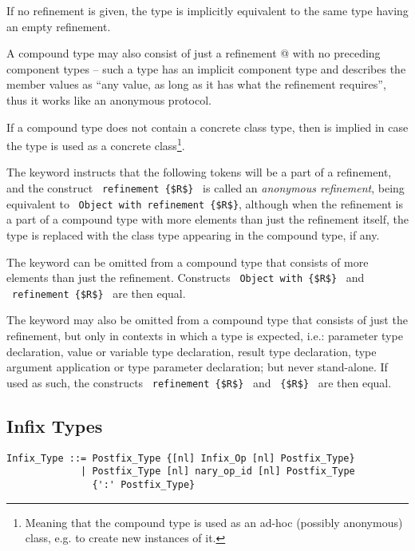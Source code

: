 If no refinement is given, the type is implicitly equivalent to the same type having an empty refinement. 

A compound type may also consist of just a refinement @ with no preceding component types -- such a type has an implicit component type  and describes the member values as ``any value, as long as it has what the refinement requires'', thus it works like an anonymous protocol. 

If a compound type does not contain a concrete class type, then  is implied in case the type is used as a concrete class\footnote{Meaning that the compound type is used as an ad-hoc (possibly anonymous) class, e.g. to create new instances of it.}.

The keyword  instructs that the following tokens will be a part of a refinement, and the construct ~\lstinline!refinement {$R$}!~ is called an {\em anonymous refinement}, being equivalent to ~\lstinline!Object with refinement {$R$}!, although when the refinement is a part of a compound type with more elements than just the refinement itself, the  type is replaced with the class type appearing in the compound type, if any. 

The  keyword can be omitted from a compound type that consists of more elements than just the refinement. Constructs ~\lstinline!Object with {$R$}!~ and ~\lstinline!refinement {$R$}!~ are then equal. 

The  keyword may also be omitted from a compound type that consists of just the refinement, but only in contexts in which a type is expected, i.e.: parameter type declaration, value or variable type declaration, result type declaration, type argument application or type parameter declaration; but never stand-alone. If used as such, the constructs ~\lstinline!refinement {$R$}!~ and ~\lstinline!{$R$}!~ are then equal. 





\subsection{Infix Types}
\label{sec:infix-types}

\syntax\begin{lstlisting}
Infix_Type ::= Postfix_Type {[nl] Infix_Op [nl] Postfix_Type}
             | Postfix_Type [nl] nary_op_id [nl] Postfix_Type 
               {':' Postfix_Type}
\end{lstlisting}

